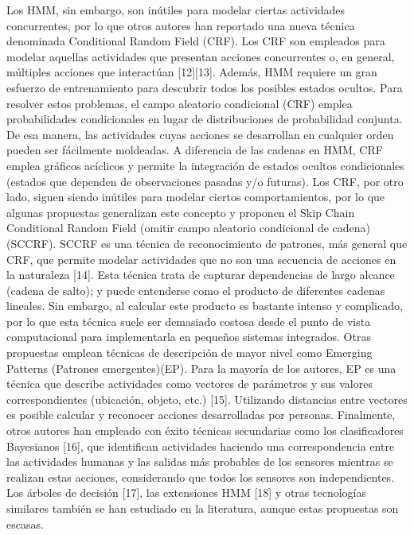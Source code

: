\documentclass[10pt]{article}
\begin{document}
Los HMM, sin embargo, son inútiles para modelar ciertas actividades concurrentes, por lo que otros autores han reportado una nueva técnica denominada Conditional Random Field (CRF). Los CRF son empleados para modelar aquellas actividades que presentan acciones concurrentes o, en general, múltiples acciones que interactúan [12][13]. Además, HMM requiere un gran esfuerzo de entrenamiento para descubrir todos los posibles estados ocultos. Para resolver estos problemas, el campo aleatorio condicional (CRF) emplea probabilidades condicionales en lugar de distribuciones de probabilidad conjunta. De esa manera, las actividades cuyas acciones se desarrollan en cualquier orden pueden ser fácilmente moldeadas. A diferencia de las cadenas en HMM, CRF emplea gráficos acíclicos y permite la integración de estados ocultos condicionales (estados que dependen de observaciones pasadas y/o futuras).
Los CRF, por otro lado, siguen siendo inútiles para modelar ciertos comportamientos, por lo que algunas propuestas generalizan este concepto y proponen el Skip Chain Conditional Random Field (omitir campo aleatorio condicional de cadena)(SCCRF). SCCRF es una técnica de reconocimiento de patrones, más general que CRF, que permite modelar actividades que no son una secuencia de acciones en la naturaleza [14]. Esta técnica trata de capturar dependencias de largo alcance (cadena de salto); y puede entenderse como el producto de diferentes cadenas lineales. Sin embargo, al calcular este producto es bastante intenso y complicado, por lo que esta técnica suele ser demasiado costosa desde el punto de vista computacional para implementarla en pequeños sistemas integrados.
Otras propuestas emplean técnicas de descripción de mayor nivel como Emerging Patterns (Patrones emergentes)(EP). Para la mayoría de los autores, EP es una técnica que describe actividades como vectores de parámetros y sus valores correspondientes (ubicación, objeto, etc.) [15]. Utilizando distancias entre vectores es posible calcular y reconocer acciones desarrolladas por personas. Finalmente, otros autores han empleado con éxito técnicas secundarias como los clasificadores Bayesianos [16], que identifican actividades haciendo una correspondencia entre las actividades humanas y las salidas más probables de los sensores mientras se realizan estas acciones, considerando que todos los sensores son independientes. Los árboles de decisión [17], las extensiones HMM [18] y otras tecnologías similares también se han estudiado en la literatura, aunque estas propuestas son escasas.
\end{document}
